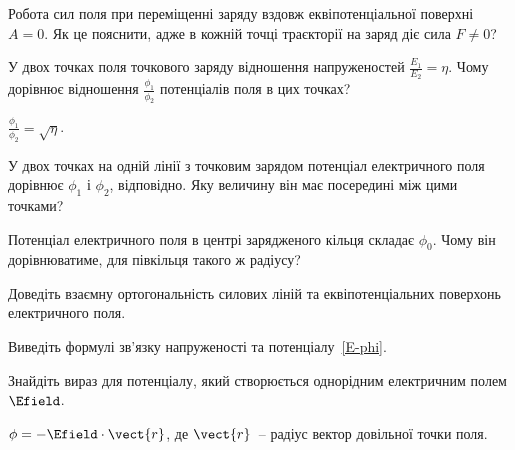 \begin{problem}
    Робота сил поля при переміщенні заряду вздовж еквіпотенціальної поверхні $A = 0$. Як це пояснити, адже в кожній точці траєкторії на заряд діє сила $F \neq 0$?

\end{problem}

\begin{problem}
    У двох точках поля точкового заряду відношення напруженостей $\frac{E_1}{E_2} = \eta$. Чому дорівнює відношення $\frac{\phi_1}{\phi_2}$ потенціалів поля в цих точках?
\begin{solution}
	$\frac{\phi_1}{\phi_2} =\sqrt\eta$.
\end{solution}
\end{problem}

\begin{problem}
    У двох точках на одній лінії з точковим зарядом потенціал електричного поля дорівнює $\phi_1$ і $\phi_2$, відповідно. Яку величину він має посередині між цими точками?

\end{problem}

\begin{problem}
    Потенціал електричного поля в центрі зарядженого кільця складає $\phi_0$. Чому він дорівнюватиме, для півкільця такого ж радіусу?
\end{problem}

\begin{problem}
    Доведіть взаємну ортогональність силових ліній та еквіпотенціальних поверхонь електричного поля.
\end{problem}

\begin{problem}
    Виведіть формулі зв'язку напруженості та потенціалу~\eqref{E-phi}.
\end{problem}

\begin{problem}
    Знайдіть вираз для потенціалу, який створюється однорідним електричним полем $\Efield$.
\begin{solution}
	$\phi = -\Efield\cdot\vect{r}$, де $\vect{r}$~-- радіус вектор довільної точки поля.
\end{solution}
\end{problem}


